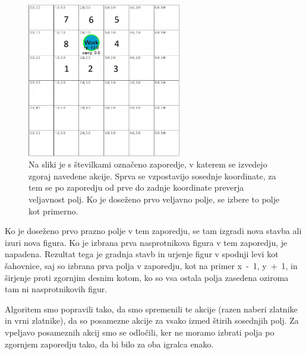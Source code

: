\documentclass[a4paper, 12pt]{book}
\begin{document}
{\begin{figure}[h!]
	\begin{center}
		\includegraphics[width=0.6\textwidth]{photos/korakiPreverjanja.pdf}
	\end{center}
	\caption{Na sliki je s številkami označeno zaporedje, v katerem se izvedejo zgoraj navedene akcije. 
		Sprva se vzpostavijo sosednje koordinate, za tem se po zaporedju od prve do zadnje koordinate preverja veljavnost polj. 
		Ko je doseženo prvo veljavno polje, se izbere to polje kot primerno. }
	\label{pickorakiPreverjanja}
\end{figure}

\noindent
Ko je doseženo prvo prazno polje v tem zaporedju, se tam izgradi nova stavba ali izuri nova figura.
Ko je izbrana prva nasprotnikova figura v tem zaporedju, je napadena.
Rezultat tega je gradnja stavb in urjenje figur v spodnji levi kot šahovnice, saj so izbrana prva polja v zaporedju, kot na primer x~-~1, y~+~1, in širjenje proti zgornjim desnim kotom, ko so vsa ostala polja zasedena oziroma tam ni nasprotnikovih figur.

Algoritem smo popravili tako, da smo spremenili te akcije (razen naberi zlatnike in vrni zlatnike), da so posamezne akcije za vsako izmed štirih sosednjih polj.
Za vpeljavo posameznih akcij smo se odločili, ker ne moramo izbrati polja po zgornjem zaporedju tako, da bi bilo za oba igralca enako.\\

}
\end{document}
